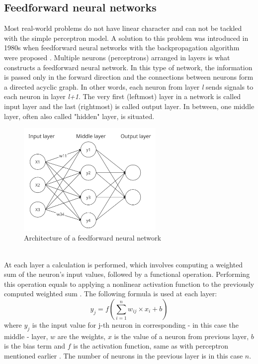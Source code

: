 \subsection*{Feedforward neural networks}
Most real-world problems do not have linear character and can not be tackled with the simple perceptron model. A solution to this problem was introduced in 1980s when feedforward neural networks with the backpropagation algorithm were proposed \cite{navrat2007umela}. Multiple neurons (perceptrons) arranged in layers is what constructs a feedforward neural network. In this type of network, the information is passed only in the forward direction and the connections between neurons form a directed acyclic graph. In other words, each neuron from layer \textit{l} sends signals to each neuron in layer \textit{l+1}. The very first (leftmost) layer in a network is called input layer and the last (rightmost) is called output layer. In between, one middle layer, often also called "hidden" layer, is situated. 
\begin{figure}[!ht]
\centering
\includegraphics[width=7cm]{assets/images/FFN}
\caption{Architecture of a feedforward neural network
\label{fig:FFN}}
\end{figure}
\\At each layer a calculation is performed, which involves computing a weighted sum of the neuron's input values, followed by a functional operation. Performing this operation equals to applying a nonlinear activation function to the previously computed weighted sum \cite{tutorialIEEE}. The following formula is used at each layer:
\begin{equation}
    y_{j}=f\left({\sum \limits _{i=1}^{n} w_{ij} \times x_{i} + b}\right)
\end{equation}
where $y_j$ is the input value for j-th neuron in corresponding - in this case the middle - layer, $w$ are the weights, $x$ is the value of a neuron from previous layer, $b$ is the bias term and $f$ is the activation function, same as with perceptron mentioned earlier \cite{tutorialIEEE}. The number of neurons in the previous layer is in this case $n$.

